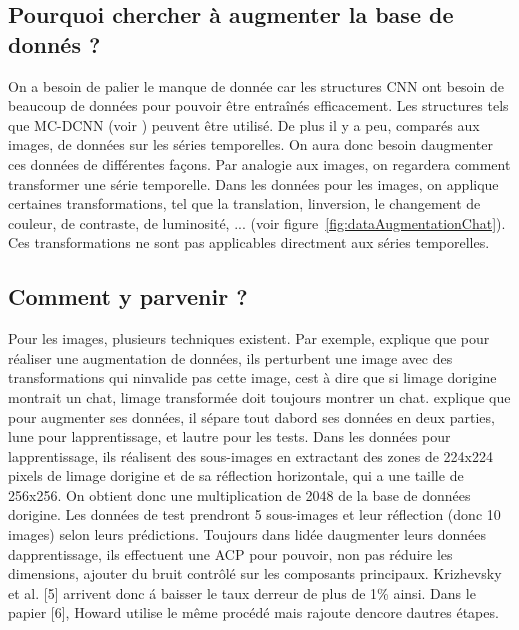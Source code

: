 \documentclass[11pt]{sdm}
\begin{document}
	\subsection{Pourquoi chercher \`a augmenter la base de donn\'es ?}
		On a besoin de palier le manque de donn\'ee car les structures CNN ont besoin de beaucoup de donn\'ees pour pouvoir \^etre entra\^in\'es efficacement. Les structures tels que MC-DCNN (voir \cite{zheng2014time}) peuvent \^etre utilis\'e.
		De plus il y a peu, compar\'es aux images, de donn\'ees sur les s\'eries temporelles. On aura donc besoin d\textquotesingle augmenter ces donn\'ees de diff\'erentes fa\c cons.
		Par analogie aux images, on regardera comment transformer une s\'erie temporelle. Dans les donn\'ees pour les images, on applique certaines transformations, tel que la translation, l\textquotesingle inversion, le changement de couleur, de contraste, de luminosit\'e, ... (voir figure~\ref{fig:dataAugmentationChat}). Ces transformations ne sont pas applicables directment aux s\'eries temporelles.

	\subsection{Comment y parvenir ?}
		Pour les images, plusieurs techniques existent. Par exemple, \cite{chatfield2014return} explique que pour r\'ealiser une augmentation de donn\'ees, ils perturbent une image avec des transformations qui n\textquotesingle invalide pas cette image, c\textquotesingle est \`a dire que si l\textquotesingle image d\textquotesingle origine montrait un chat, l\textquotesingle image transform\'ee doit toujours montrer un chat. \cite{krizhevsky2012imagenet} explique que pour augmenter ses donn\'ees, il s\'epare tout d\textquotesingle abord ses donn\'ees en deux parties, l\textquotesingle une pour l\textquotesingle apprentissage, et l\textquotesingle autre pour les tests. Dans les donn\'ees pour l\textquotesingle apprentissage, ils r\'ealisent des sous-images en extractant des zones de 224x224 pixels de l\textquotesingle image d\textquotesingle origine et de sa r\'eflection horizontale, qui a une taille de 256x256. On obtient donc une multiplication de 2048 de la base de donn\'ees d\textquotesingle origine. Les donn\'ees de test prendront 5 sous-images et leur r\'eflection (donc 10 images) selon leurs pr\'edictions. Toujours dans l\textquotesingle id\'ee d\textquotesingle augmenter leurs donn\'ees d\textquotesingle apprentissage, ils effectuent une ACP pour pouvoir, non pas r\'eduire les dimensions, ajouter du bruit contrôl\'e sur les composants principaux. Krizhevsky et al. [5] arrivent donc \'a baisser le taux d\textquotesingle erreur de plus de 1\% ainsi. Dans le papier [6], Howard utilise le m\^eme proc\'ed\'e mais rajoute d\textquotesingle encore d\textquotesingle autres \'etapes. 
\end{document}
